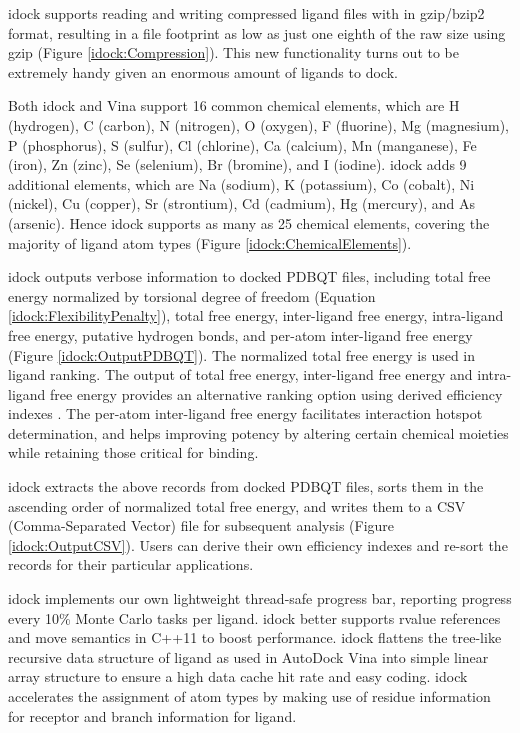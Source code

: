 idock supports reading and writing compressed ligand files with in gzip/bzip2 format, resulting in a file footprint as low as just one eighth of the raw size using gzip (Figure \ref{idock:Compression}). This new functionality turns out to be extremely handy given an enormous amount of ligands to dock.

Both idock and Vina support 16 common chemical elements, which are H (hydrogen), C (carbon), N (nitrogen), O (oxygen), F (fluorine), Mg (magnesium), P (phosphorus), S (sulfur), Cl (chlorine), Ca (calcium), Mn (manganese), Fe (iron), Zn (zinc), Se (selenium), Br (bromine), and I (iodine). idock adds 9 additional elements, which are Na (sodium), K (potassium), Co (cobalt), Ni (nickel), Cu (copper), Sr (strontium), Cd (cadmium), Hg (mercury), and As (arsenic). Hence idock supports as many as 25 chemical elements, covering the majority of ligand atom types (Figure \ref{idock:ChemicalElements}). %

idock outputs verbose information to docked PDBQT files, including total free energy normalized by torsional degree of freedom (Equation \eqref{idock:FlexibilityPenalty}), total free energy, inter-ligand free energy, intra-ligand free energy, putative hydrogen bonds, and per-atom inter-ligand free energy (Figure \ref{idock:OutputPDBQT}). The normalized total free energy is used in ligand ranking. The output of total free energy, inter-ligand free energy and intra-ligand free energy provides an alternative ranking option using derived efficiency indexes \citep{335,336,337}. The per-atom inter-ligand free energy facilitates interaction hotspot determination, and helps improving potency by altering certain chemical moieties while retaining those critical for binding.

idock extracts the above records from docked PDBQT files, sorts them in the ascending order of normalized total free energy, and writes them to a CSV (Comma-Separated Vector) file for subsequent analysis (Figure \ref{idock:OutputCSV}). Users can derive their own efficiency indexes \citep{335,336,337} and re-sort the records for their particular applications.

idock implements our own lightweight thread-safe progress bar, reporting progress every 10\% Monte Carlo tasks per ligand. idock better supports rvalue references and move semantics in C++11 to boost performance. idock flattens the tree-like recursive data structure of ligand as used in AutoDock Vina into simple linear array structure to ensure a high data cache hit rate and easy coding. idock accelerates the assignment of atom types by making use of residue information for receptor and branch information for ligand.

